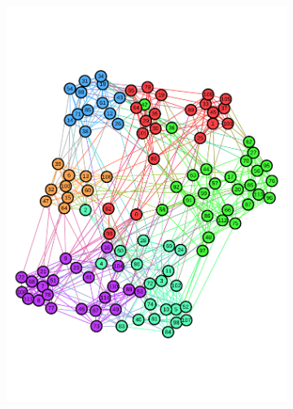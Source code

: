 \begin{figure}[!ht]
\begin{subfigure}{.3\textwidth}
\includegraphics[width=.99\linewidth]{img/chap2/football_orig.pdf}
\caption{}
\label{fig:football_orig}
\end{subfigure}
\begin{subfigure}{.3\textwidth}
\centering

\end{subfigure}
\end{figure}
